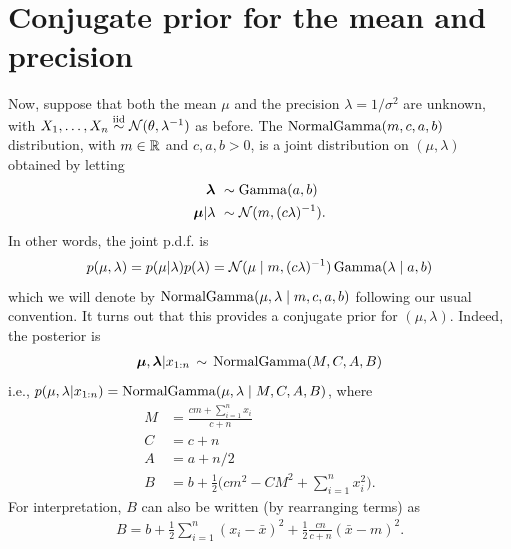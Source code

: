 \documentclass[12pt]{article}
\begin{document}






\section{Conjugate prior for the mean and precision}
\label{section:conjugate-mean-precision}

Now, suppose that both the mean $\mu$ and the precision $\lambda= 1/\sigma^2$ are unknown, with $X_1,\dotsc,X_n\stackrel{\mathrm{iid}}{\sim}\mathcal{N}(\theta,\lambda^{-1})$ as before. The $\operatorname*{NormalGamma}(m,c,a,b)$ distribution, with $m\in\mathbb{R}$ and $c,a,b>0$, is a joint distribution on $(\mu,\lambda)$ obtained by letting
\begin{align*}
\bm\lambda \,\,&\sim\operatorname*{Gamma}(a,b)\\
\bm\mu|\lambda \,\,&\sim \mathcal{N}(m,(c\lambda)^{-1}).
\end{align*}
In other words, the joint p.d.f. is
$$ p(\mu,\lambda) = p(\mu|\lambda) p(\lambda) =\mathcal{N}(\mu\mid m,(c\lambda)^{-1})\operatorname*{Gamma}(\lambda\mid a,b) $$
which we will denote by $\operatorname*{NormalGamma}(\mu,\lambda\mid m,c,a,b)$ following our usual convention.
It turns out that this provides a conjugate prior for $(\mu,\lambda)$.
Indeed, the posterior is
\begin{align}\label{equation:NormalGamma-posterior}
\bm\mu,\bm\lambda|x_{1:n}\,\sim\,\operatorname*{NormalGamma}(M,C,A,B)
\end{align}
i.e., $p(\mu,\lambda|x_{1:n}) =\operatorname*{NormalGamma}(\mu,\lambda\mid M,C,A,B)$, where
\begin{align*}
    M & =\frac{c m +\sum_{i=1}^n x_i}{c + n}\\
    C & = c + n\\
    A & = a + n/2\\
    B & = b +\tfrac{1}{2}\big(c m^2-C M^2+\textstyle\sum_{i=1}^n x_i^2\big).
\end{align*}
For interpretation, $B$ can also be written (by rearranging terms) as 
\begin{align}\label{equation:B}
B = b + \frac{1}{2}\sum_{i=1}^n (x_i-\bar x)^2 + \frac{1}{2}\frac{c n}{c + n}(\bar x - m)^2.
\end{align}
\end{document}
